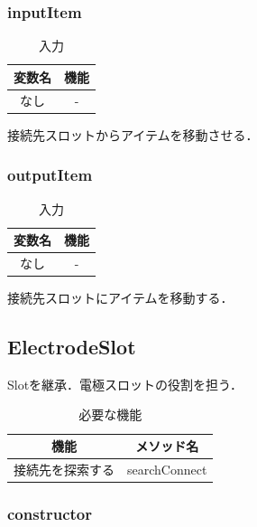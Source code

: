 \documentclass[uplatex,dvipdfmx,report]{jlreq}
\begin{document}
\subsubsection{inputItem}

\begin{table}[H]
    \centering
    \caption{入力}
    \begin{tabular}{cc}
        \hline
        変数名 & 機能 \\
        \hline
        \hline
        なし & - \\
        \hline
    \end{tabular}
\end{table}

接続先スロットからアイテムを移動させる．

\subsubsection{outputItem}

\begin{table}[H]
    \centering
    \caption{入力}
    \begin{tabular}{cc}
        \hline
        変数名 & 機能 \\
        \hline
        \hline
        なし & - \\
        \hline
    \end{tabular}
\end{table}

接続先スロットにアイテムを移動する．

\subsection{ElectrodeSlot}

Slotを継承．電極スロットの役割を担う．

\begin{table}[H]
    \centering
    \caption{必要な機能}
    \begin{tabular}{cc}
        \hline
        機能 & メソッド名 \\
        \hline
        \hline
        接続先を探索する & searchConnect \\
        \hline
    \end{tabular}
\end{table}

\subsubsection{constructor}
\end{document}
